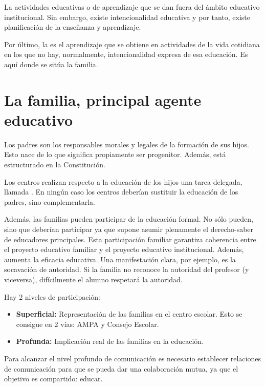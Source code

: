 \documentclass[palatino]{apuntesURJC}
\begin{document}
La  actividades educativas o de aprendizaje que se dan fuera del ámbito educativo institucional. 
%
Sin embargo, existe intencionalidad educativa y por tanto, existe planificación de la enseñanza y aprendizaje.

Por último, la  es el aprendizaje que se obtiene en actividades de la vida cotidiana en los que no hay, normalmente, intencionalidad expresa de esa educación.
%
Es aquí donde se sitúa la familia.


\section{La familia, principal agente educativo}

Los padres son los responsables morales y legales de la formación de sus hijos. 
%
Esto nace de lo que significa propiamente ser progenitor.
%
Además, está estructurado en la Constitución.

Los centros realizan respecto a la educación de los hijos una tarea delegada, llamada .
%
En ningún caso los centros deberían sustituir la educación de los padres, sino complementarla.

Además, las familias pueden participar de la educación formal. 
%
No sólo pueden, sino que deberían participar ya que supone asumir plenamente el derecho-saber de educadores principales.
%
Esta participación familiar garantiza coherencia entre el proyecto educativo familiar y el proyecto educativo institucional. 
%
Además, aumenta la eficacia educativa.
%
Una manifestación clara, por ejemplo, es la socavación de autoridad. 
%
Si la familia no reconoce la autoridad del profesor (y viceversa), difícilmente el alumno respetará la autoridad.

Hay 2 niveles de participación:
\begin{itemize}
	\item \textbf{Superficial:} Representación de las familias en el centro escolar. 
	Esto se consigue en 2 vías: AMPA y Consejo Escolar.
	\item \textbf{Profunda:} Implicación real de las familias en la educación.
\end{itemize}


Para alcanzar el nivel profundo de comunicación es necesario establecer relaciones de comunicación para que se pueda dar una colaboración mutua, ya que el objetivo es compartido: educar.
\end{document}
